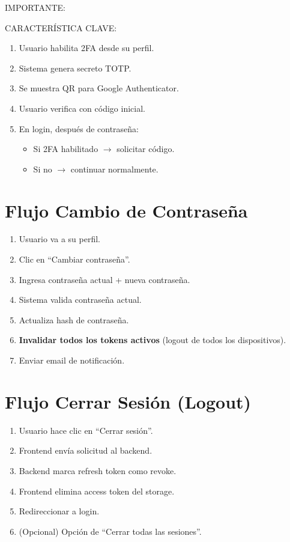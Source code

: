 \documentclass[12pt,a4paper,oneside]{book}
\begin{document}
\begin{alert}{IMPORTANTE:}
\begin{info}{CARACTERÍSTICA CLAVE:}
\begin{enumerate}
    \item Usuario habilita 2FA desde su perfil.
    \item Sistema genera secreto TOTP.
    \item Se muestra QR para Google Authenticator.
    \item Usuario verifica con código inicial.
    \item En login, después de contraseña:
    \begin{itemize}
        \item Si 2FA habilitado $\rightarrow$ solicitar código.
        \item Si no $\rightarrow$ continuar normalmente.
    \end{itemize}
\end{enumerate}

\section{Flujo Cambio de Contraseña}
\label{flujo:cambio_password}

\begin{enumerate}
    \item Usuario va a su perfil.
    \item Clic en ``Cambiar contraseña''.
    \item Ingresa contraseña actual + nueva contraseña.
    \item Sistema valida contraseña actual.
    \item Actualiza hash de contraseña.
    \item \textbf{Invalidar todos los tokens activos} (logout de todos los dispositivos).
    \item Enviar email de notificación.
\end{enumerate}

\section{Flujo Cerrar Sesión (Logout)}
\label{flujo:logout}

\begin{enumerate}
    \item Usuario hace clic en ``Cerrar sesión''.
    \item Frontend envía solicitud al backend.
    \item Backend marca refresh token como revoke.
    \item Frontend elimina access token del storage.
    \item Redireccionar a login.
    \item (Opcional) Opción de ``Cerrar todas las sesiones''.
\end{enumerate}


\end{info}
\end{alert}
\end{document}
